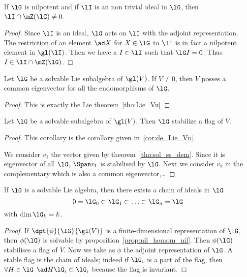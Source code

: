 \begin{lemma}
	If $\lG$ is nilpotent and if $\lI$ is an non trivial ideal in $\lG$, then $\lI\cap\mZ(\lG)\neq 0$.
\end{lemma}

\begin{proof}
	Since $\lI$ is an ideal, $\lG$ acts on $\lI$ with the adjoint representation. The restriction of an element $\ad X$ for $X\in\lG$ to $\lI$ is in fact a nilpotent element in $\gl(\lI)$. Then we have a $I\in\lI$ such that $\lG I=0$. Thus $I\in\lI\cap\mZ(\lG)$.
\end{proof}

\begin{theorem}
	Let $\lG$ be a solvable Lie subalgebra of $\gl(V)$. If $V\neq 0$, then $V$ posses a common eigenvector for all the endomorphisms of $\lG$.
	\label{tho:sol_ss_dem}
\end{theorem}

\begin{proof}
	This is exactly the Lie theorem~\ref{tho:Lie_Vu}
\end{proof}

\begin{corollary}
	Let $\lG$ be a solvable subalgebra of $\gl(V)$. Then $\lG$ stabilize a flag of $V$.
	\label{tho:Lie_Vd}
\end{corollary}

\begin{proof}

	This corollary is the corollary given in~\ref{cor:de_Lie_Vu}.

	We consider $v_1$ the vector given by theorem~\ref{tho:sol_ss_dem}. Since it is eigenvector of all $\lG$, $\Span v_1$ is stabilised by $\lG$. Next we consider $v_2$ in the complementary which is also a common eigenvector,\ldots
\end{proof}

\begin{corollary}
	If $\lG$ is a solvable Lie algebra, then there exists a chain of ideals in $\lG$
	\[
		0=\lG_0\subset\lG_1\subset\ldots\subset\lG_n=\lG
	\]
	with $\dim\lG_k=k$.
\end{corollary}

\begin{proof}
	If $\dpt{\phi}{\lG}{\gl(V)}$ is a finite-dimensional representation of $\lG$, then $\phi(\lG)$ is solvable by proposition~\ref{prop:nil_homom_nil}. Then $\phi(\lG)$ stabilises a flag of $V$. Now we take as $\phi$ the adjoint representation of $\lG$. A stable flag is the chain of ideals; indeed if $\lG_i$ is a part of the flag, then $\forall H\in\lG$ $\ad H\lG_i\subset\lG_i$ because the flag is invariant.
\end{proof}


